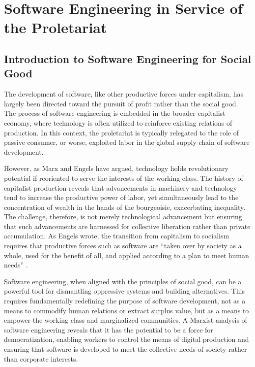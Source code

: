 \chapter{Software Engineering in Service of the Proletariat}
\begin{refsection}

\section{Introduction to Software Engineering for Social Good}

The development of software, like other productive forces under capitalism, has largely been directed toward the pursuit of profit rather than the social good. The process of software engineering is embedded in the broader capitalist economy, where technology is often utilized to reinforce existing relations of production. In this context, the proletariat is typically relegated to the role of passive consumer, or worse, exploited labor in the global supply chain of software development.

However, as Marx and Engels have argued, technology holds revolutionary potential if reoriented to serve the interests of the working class. The history of capitalist production reveals that advancements in machinery and technology tend to increase the productive power of labor, yet simultaneously lead to the concentration of wealth in the hands of the bourgeoisie, exacerbating inequality. The challenge, therefore, is not merely technological advancement but ensuring that such advancements are harnessed for collective liberation rather than private accumulation. As Engels wrote, the transition from capitalism to socialism requires that productive forces such as software are “taken over by society as a whole, used for the benefit of all, and applied according to a plan to meet human needs” \cite[pp.~218]{engels1880}.

Software engineering, when aligned with the principles of social good, can be a powerful tool for dismantling oppressive systems and building alternatives. This requires fundamentally redefining the purpose of software development, not as a means to commodify human relations or extract surplus value, but as a means to empower the working class and marginalized communities. A Marxist analysis of software engineering reveals that it has the potential to be a force for democratization, enabling workers to control the means of digital production and ensuring that software is developed to meet the collective needs of society rather than corporate interests.


\end{refsection}
